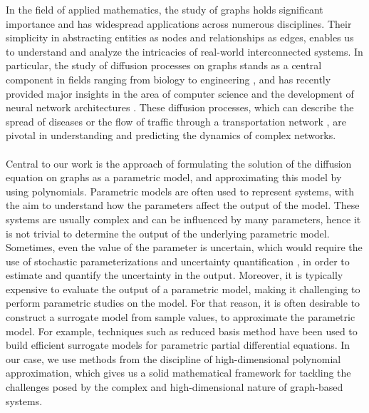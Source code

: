 \documentclass[12pt, oneside]{report}   	%
\begin{document}
In the field of applied mathematics, the study of graphs holds significant importance and has widespread applications across numerous disciplines. Their simplicity in abstracting entities as nodes and relationships as edges, enables us to understand and analyze the intricacies of real-world interconnected systems. In particular, the study of diffusion processes on graphs stands as a central component in fields ranging from biology \cite{yi2024graph} to engineering \cite{lejay2003simulating}, and has recently provided major insights in the area of computer science and the development of neural network architectures \cite{chamberlain2021grand}. These diffusion processes, which can describe the spread of diseases \cite{dreyer2009irreversible} or the flow of traffic through a transportation network \cite{barnier2004graph}, are pivotal in understanding and predicting the dynamics of complex networks.\\\\
Central to our work is the approach of formulating the solution of the diffusion equation on graphs as a parametric model, and approximating this model by using polynomials. Parametric models are often used to represent systems, with the aim to understand how the parameters affect the output of the model. These systems are usually complex and can be influenced by many parameters, hence it is not trivial to determine the output of the underlying parametric model. Sometimes, even the value of the parameter is uncertain, which would require the use of stochastic parameterizations and uncertainty quantification \cite{ghanem2017handbook}, in order to estimate and quantify the uncertainty in the output. Moreover, it is typically expensive to evaluate the output of a parametric model, making it challenging to perform parametric studies on the model. For that reason, it is often desirable to construct a surrogate model from sample values, to approximate the parametric model. For example, techniques such as reduced basis method \cite{negri2013reduced} have been used to build efficient surrogate models for parametric partial differential equations. In our case, we use methods from the discipline of high-dimensional polynomial approximation, which gives us a solid mathematical framework for tackling the challenges posed by the complex and high-dimensional nature of graph-based systems.\\\\
\end{document}
